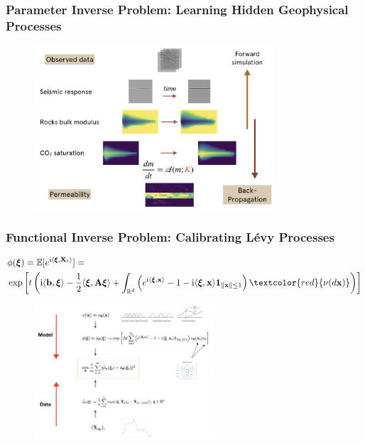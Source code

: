 \documentclass{beamer}
\newcommand{\bx}{\mathbf{x}}
\newcommand{\ii}{\mathrm{i}}
\newcommand{\bxi}{\bm{\xi}}
\newcommand{\bb}{\mathbf{b}}
\newcommand{\bA}{\mathbf{A}}
\newcommand{\bX}{\mathbf{X}}
\newcommand{\red}[1]{\textcolor{red}{#1}}
\newcommand{\RR}[0]{\mathbb{R}}
\begin{document}
\begin{frame}
	\frametitle{Parameter Inverse Problem: Learning Hidden Geophysical Processes}
	\begin{figure}[hbt]
  \includegraphics[width=0.8\textwidth]{../geo.png}
\end{figure}
\end{frame}

\begin{frame}
	\frametitle{Functional Inverse Problem: Calibrating L\'evy Processes}
	{\small
	\begin{align*}
		 		& \phi(\bm{\bxi}) = \mathbb{E}[e^{\ii \langle \bxi, \bX_t \rangle}]= \\
		 		& \exp\left[t\left( \ii \langle \bb, \bxi \rangle - \frac{1}{2}\langle \bxi, \bA\bxi\rangle  +\int_{\RR^d} \left( e^{\ii \langle \bxi, \bx\rangle} - 1 - \ii \langle \bxi, \bx\rangle \mathbf{1}_{\|\bx\|\leq 1}\right)\red{\nu(d\bx)}\right) \right]
		 	\end{align*}
		 	}
	\begin{figure}[hbt]
	 \includegraphics[width=0.6\textwidth]{../algo.png}
\end{figure}
\end{frame}
\end{document}
